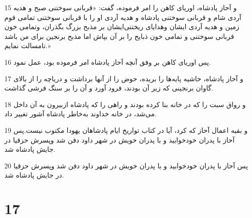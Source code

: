 \par 15 و آحاز پادشاه، اوریای کاهن را امر فرموده، گفت: «قربانی سوختنی صبح و هدیه آردی شام و قربانی سوختنی پادشاه و هدیه آردی او را با قربانی سوختنی تمامی قوم زمین و هدیه آردی ایشان وهدایای ریختنی‌ایشان بر مذبح بزرگ بگذران، وتمامی خون قربانی سوختنی و تمامی خون ذبایح را بر آن بپاش اما مذبح برنجین برای من باشد تامسالت نمایم.»
\par 16 پس اوریای کاهن بر وفق آنچه آحاز پادشاه امر فرموده بود، عمل نمود.
\par 17 و آحاز پادشاه، حاشیه پایه‌ها را بریده، حوض را از آنها برداشت و دریاچه را از بالای گاوان برنجینی که زیر آن بودند، فرود آورد و آن را بر سنگ فرشی گذاشت.
\par 18 و رواق سبت را که در خانه بنا کرده بودند و راهی را که پادشاه ازبیرون به آن داخل می‌شد، در خانه خداوند به‌خاطر پادشاه آشور تغییر داد.
\par 19 و بقیه اعمال آحاز که کرد، آیا در کتاب تواریخ ایام پادشاهان یهودا مکتوب نیست.پس آحاز با پدران خودخوابید و با پدران خویش در شهر داود دفن شد وپسرش حزقیا در جایش پادشاه شد.
\par 20 پس آحاز با پدران خودخوابید و با پدران خویش در شهر داود دفن شد وپسرش حزقیا در جایش پادشاه شد.
 
\chapter{17}


